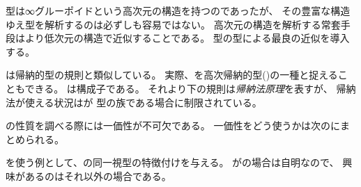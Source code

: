 \documentclass[index]{subfiles}
\begin{document}

型は∞グルーポイドという高次元の構造を持つのであったが、
その豊富な構造ゆえ型を解析するのは必ずしも容易ではない。
高次元の構造を解析する常套手段はより低次元の構造で近似することである。
型の型による最良の近似を導入する。



は帰納的型の規則と類似している。
実際、を高次帰納的型()の一種と捉えることもできる。
は構成子である。
それより下の規則は\emph{帰納法原理}を表すが、
帰納法が使える状況はが
型の族である場合に制限されている。



の性質を調べる際には一価性が不可欠である。
一価性をどう使うかは次のにまとめられる。



を使う例として、の同一視型の特徴付けを与える。
が\myInlineMath{\myTLMinusTwo}の場合は自明なので、
興味があるのはそれ以外の場合である。


\end{document}
